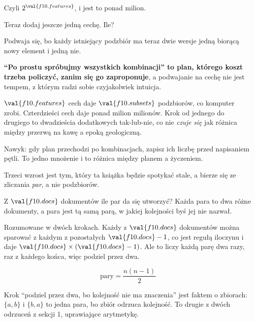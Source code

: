 \begin{fr}
Czyli $2^{\val{f10.features}}$, i jest to ponad milion.

Teraz dodaj jeszcze jedną cechę. Ile?
\nextframe
\end{fr}

\begin{fr}
Podwaja się, bo każdy istniejący podzbiór ma teraz dwie wersje \dash{} jedną
biorącą nowy element i jedną nie.

\begin{trapbox}
\textbf{\enquote{Po prostu spróbujmy wszystkich kombinacji} to plan, którego
koszt trzeba policzyć, zanim się go zaproponuje}, a podwajanie na cechę nie
jest tempem, z którym radzi sobie czyjakolwiek intuicja.

$\val{f10.features}$ cech daje $\val{f10.subsets}$ podzbiorów, co komputer
zrobi. Czterdzieści cech daje ponad milion milionów. Krok od jednego do
drugiego to dwadzieścia dodatkowych tak-lub-nie, co nie \emph{czuje się} jak
różnica między przerwą na kawę a epoką geologiczną.

Nawyk: gdy plan przechodzi po kombinacjach, zapisz ich liczbę przed napisaniem
pętli. To jedno mnożenie i to różnica między planem a życzeniem.
\end{trapbox}
\end{fr}

\begin{fr}
Trzeci wzrost jest tym, który ta książka będzie spotykać stale, a bierze się ze
zliczania \emph{par}, a nie podzbiorów.

Z $\val{f10.docs}$ dokumentów ile par da się utworzyć? Każda para to dwa różne
dokumenty, a para jest tą samą parą, w jakiej kolejności byś jej nie nazwał.
\nextframe
\end{fr}

\begin{fr}
Rozumowane w dwóch krokach. Każdy z $\val{f10.docs}$ dokumentów można sparować
z każdym z pozostałych $\val{f10.docs} - 1$, co jest regułą iloczynu i daje
$\val{f10.docs} \times (\val{f10.docs} - 1)$. Ale to liczy każdą parę dwa razy,
raz z każdego końca, więc podziel przez dwa.

\[ \text{pary} = \frac{n(n-1)}{2} \]

Krok \enquote{podziel przez dwa, bo kolejność nie ma znaczenia} jest faktem o
zbiorach: $\{a, b\}$ i $\{b, a\}$ to jedna para, bo zbiór odrzuca kolejność.
To drugie z dwóch odrzuceń z sekcji 1, uprawiające arytmetykę.

\end{fr}

